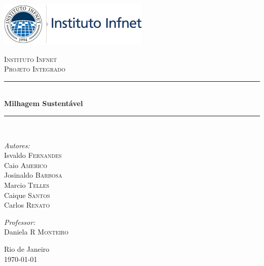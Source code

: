 \documentclass[]{article}
\newcommand{\HRule}{\rule{\linewidth}{0.5mm}}
\begin{document}
\begin{titlepage}
\begin{center}
\includegraphics{./titulo.png}

\textsc{\LARGE Instituto Infnet}\\[1.5cm]

\textsc{\Large Projeto Integrado}\\[0.5cm]

\HRule \\[0.4cm]
{ \huge \bfseries Milhagem Sustentável \\[0.4cm] }

\HRule \\[1.5cm]
\noindent
\begin{minipage}{0.4\textwidth}
\begin{flushleft} \large
\emph{Autores:}\\
Isvaldo \textsc{Fernandes}\\
Caio \textsc{Americo}\\
Josinaldo \textsc{Barbosa}\\
Marcio \textsc{Telles}\\
Caique \textsc{Santos}\\
Carlos \textsc{Renato}
\end{flushleft}
\end{minipage}%
\begin{minipage}{0.4\textwidth}
\begin{flushright} \large
\emph{Professor:} \\
Daniela R \textsc{Monteiro}
\end{flushright}
\end{minipage}

\vfill

{\large Rio de Janeiro}\\
{\large \today}

\end{center}
\end{titlepage}

\tableofcontents

\end{document}
